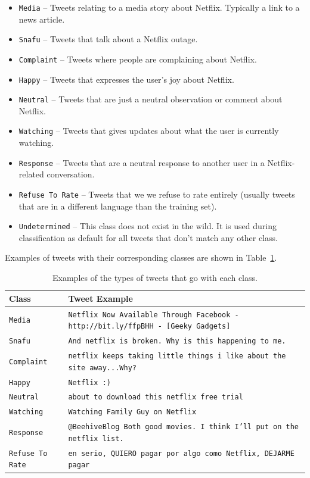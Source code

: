 \documentclass[12pt]{ucthesis}
\begin{document}
\begin{itemize}
  \item \texttt{Media} -- Tweets relating to a media story about Netflix. Typically a link to a news article.
  \item \texttt{Snafu} -- Tweets that talk about a Netflix outage.
  \item \texttt{Complaint} -- Tweets where people are complaining about Netflix.
  \item \texttt{Happy} -- Tweets that expresses the user's joy about Netflix.
  \item \texttt{Neutral} -- Tweets that are just a neutral observation or comment about Netflix.
  \item \texttt{Watching} -- Tweets that gives updates about what the user is currently watching.
  \item \texttt{Response} -- Tweets that are a neutral response to another user in a Netflix-related conversation.
  \item \texttt{Refuse To Rate} -- Tweets that we we refuse to rate entirely (usually tweets that are in a different language than the training set).
  \item \texttt{Undetermined} -- This class does not exist in the wild. It is used during classification as default for all tweets that don't match any other class.
\end{itemize}

Examples of tweets with their corresponding classes are shown in Table~\ref{table:classes}.

\begin{table}
   \begin{center}
      \begin{tabular}{|l|p{12cm}|}
         \hline
            Class & Tweet Example
         \tabularnewline\hline
            \texttt{Media} & \texttt{Netflix Now Available Through Facebook - http://bit.ly/ffpBHH - [Geeky Gadgets]}
         \tabularnewline\hline
            \texttt{Snafu} & \texttt{And netflix is broken. Why is this happening to me.}
         \tabularnewline\hline
            \texttt{Complaint} & \texttt{netflix keeps taking little things i like about the site away...Why?}
         \tabularnewline\hline
            \texttt{Happy} & \texttt{Netflix :)}
         \tabularnewline\hline
            \texttt{Neutral} & \texttt{about to download this netflix free trial}
         \tabularnewline\hline
            \texttt{Watching} & \texttt{Watching Family Guy on Netflix}
         \tabularnewline\hline
            \texttt{Response} & \texttt{@BeehiveBlog  Both good movies.  I think I'll put on the netflix list.}
         \tabularnewline\hline
            \texttt{Refuse To Rate} & \texttt{en serio, QUIERO pagar por algo como Netflix, DEJARME pagar}
         \tabularnewline\hline
      \end{tabular}
   \end{center}
   \caption[Tweet Class Examples]{Examples of the types of tweets that go with each class.}
   \label{table:classes}
\end{table}
\end{document}
